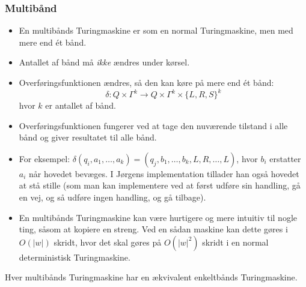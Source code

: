 \begin{frame}[allowframebreaks]
  \frametitle{Multibånd}

  \begin{itemize}
    \item En multibånds Turingmaskine er som en normal Turingmaskine, men med mere end ét bånd.
    \item Antallet af bånd må \textit{ikke} ændres under kørsel.
    \item Overføringsfunktionen ændres, så den kan køre på mere end ét bånd:
          \begin{equation}
\delta : Q \times \Gamma^{k} \longrightarrow Q \times \Gamma^{k} \times \{L, R, S\}^{k}
          \end{equation}
          hvor $k$ er antallet af bånd.
    \item Overføringsfunktionen fungerer ved at tage den nuværende tilstand i alle bånd og giver resultatet til alle bånd.
    \item For eksempel: $\delta(q_{i}, a_{1}, \ldots, a_{k}) = (q_{j}, b_{1}, \ldots, b_{k}, L, R, \ldots, L)$, hvor $b_{i}$ erstatter $a_{i}$ når hovedet bevæges. I Jørgens implementation tillader han også hovedet at stå stille (som man kan implementere ved at først udføre sin handling, gå en vej, og så udføre ingen handling, og gå tilbage).
    \item En multibånds Turingmaskine kan være hurtigere og mere intuitiv til nogle ting, såsom at kopiere en streng. Ved en sådan maskine kan dette gøres i $O(|w|)$ skridt, hvor det skal gøres på $O(|w|^{2})$ skridt i en normal deterministisk Turingmaskine.
  \end{itemize}

  \begin{theorem}
Hver multibånds Turingmaskine har en ækvivalent enkeltbånds Turingmaskine.
  \end{theorem}


\end{frame}
